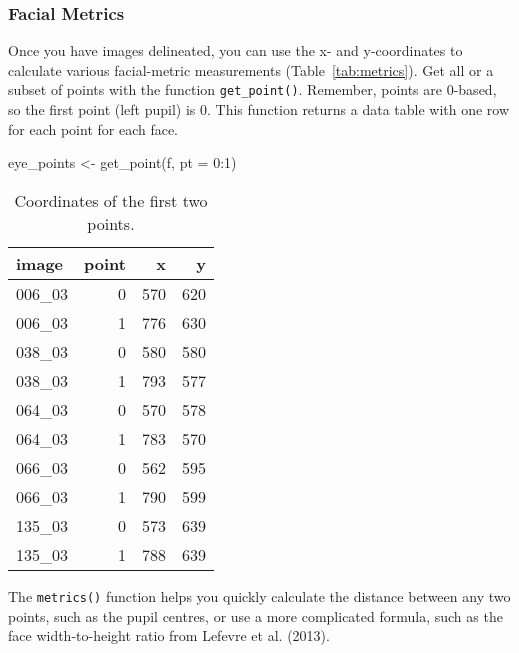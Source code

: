 \documentclass[
  doc,floatsintext]{apa6}
\newenvironment{Shaded}{\begin{snugshade}}{\end{snugshade}}
\newcommand{\AttributeTok}[1]{\textcolor[rgb]{0.77,0.63,0.00}{#1}}
\newcommand{\DecValTok}[1]{\textcolor[rgb]{0.00,0.00,0.81}{#1}}
\newcommand{\FunctionTok}[1]{\textcolor[rgb]{0.00,0.00,0.00}{#1}}
\newcommand{\NormalTok}[1]{#1}
\newcommand{\OtherTok}[1]{\textcolor[rgb]{0.56,0.35,0.01}{#1}}
\newcommand{\SpecialCharTok}[1]{\textcolor[rgb]{0.00,0.00,0.00}{#1}}
\begin{document}
\hypertarget{facial-metrics}{%
\subsubsection{Facial Metrics}\label{facial-metrics}}

Once you have images delineated, you can use the x- and y-coordinates to calculate various facial-metric measurements (Table~\ref{tab:metrics}). Get all or a subset of points with the function \texttt{get\_point()}. Remember, points are 0-based, so the first point (left pupil) is 0. This function returns a data table with one row for each point for each face.

\begin{Shaded}
\begin{Highlighting}[]
\NormalTok{eye\_points }\OtherTok{\textless{}{-}} \FunctionTok{get\_point}\NormalTok{(f, }\AttributeTok{pt =} \DecValTok{0}\SpecialCharTok{:}\DecValTok{1}\NormalTok{)}
\end{Highlighting}
\end{Shaded}

\begin{table}

\caption{\label{tab:unnamed-chunk-7}Coordinates of the first two points.}
\centering
\begin{tabular}[t]{l|r|r|r}
\hline
image & point & x & y\\
\hline
006\_03 & 0 & 570 & 620\\
\hline
006\_03 & 1 & 776 & 630\\
\hline
038\_03 & 0 & 580 & 580\\
\hline
038\_03 & 1 & 793 & 577\\
\hline
064\_03 & 0 & 570 & 578\\
\hline
064\_03 & 1 & 783 & 570\\
\hline
066\_03 & 0 & 562 & 595\\
\hline
066\_03 & 1 & 790 & 599\\
\hline
135\_03 & 0 & 573 & 639\\
\hline
135\_03 & 1 & 788 & 639\\
\hline
\end{tabular}
\end{table}

The \texttt{metrics()} function helps you quickly calculate the distance between any two points, such as the pupil centres, or use a more complicated formula, such as the face width-to-height ratio from Lefevre et al. (2013).
\end{document}
